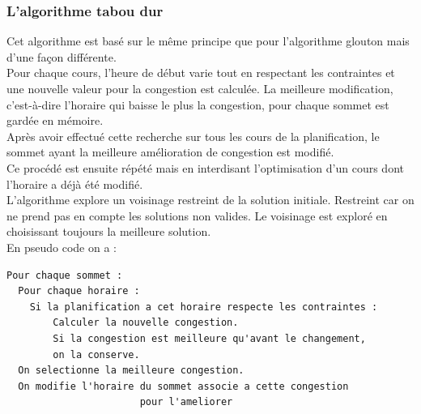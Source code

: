 \documentclass[a4paper,11pt]{article}
\begin{document}
		\subsubsection{L'algorithme tabou dur}
			Cet algorithme est basé sur le même principe que pour l'algorithme glouton mais d'une façon différente.\\
			Pour chaque cours, l'heure de début varie tout en respectant les contraintes et une nouvelle valeur pour la congestion est calculée. La meilleure modification, c'est-à-dire l'horaire qui baisse le plus la congestion, pour chaque sommet est gardée en mémoire.\\
			Après avoir effectué cette recherche sur tous les cours de la planification, le sommet ayant la meilleure amélioration de congestion est modifié.\\
			Ce procédé est ensuite répété mais en interdisant l'optimisation d'un cours dont l'horaire a déjà été modifié.\\
			L'algorithme explore un voisinage restreint de la solution initiale. Restreint car on ne prend pas en compte les solutions non valides. Le voisinage est exploré en choisissant toujours la meilleure solution.\\
			En pseudo code on a :\\
\begin{lstlisting}
Pour chaque sommet :
  Pour chaque horaire :
  	Si la planification a cet horaire respecte les contraintes :
    	Calculer la nouvelle congestion.
    	Si la congestion est meilleure qu'avant le changement,
      	on la conserve.
  On selectionne la meilleure congestion. 
  On modifie l'horaire du sommet associe a cette congestion 
  					   pour l'ameliorer
		\end{lstlisting}
\end{document}
